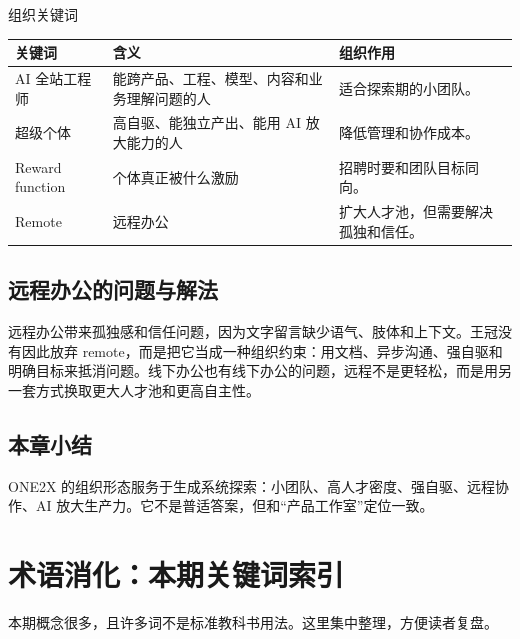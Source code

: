 \documentclass[a4paper]{article}
\begin{document}
\begin{knowledgebox}{组织关键词}
\begin{tabularx}{\textwidth}{p{}p{}X}
\toprule
关键词 & 含义 & 组织作用 \\
\midrule
AI 全站工程师 & 能跨产品、工程、模型、内容和业务理解问题的人 & 适合探索期的小团队。 \\
超级个体 & 高自驱、能独立产出、能用 AI 放大能力的人 & 降低管理和协作成本。 \\
Reward function & 个体真正被什么激励 & 招聘时要和团队目标同向。 \\
Remote & 远程办公 & 扩大人才池，但需要解决孤独和信任。 \\
\bottomrule
\end{tabularx}
\end{knowledgebox}

\subsection{远程办公的问题与解法}

远程办公带来孤独感和信任问题，因为文字留言缺少语气、肢体和上下文。王冠没有因此放弃 remote，而是把它当成一种组织约束：用文档、异步沟通、强自驱和明确目标来抵消问题。线下办公也有线下办公的问题，远程不是更轻松，而是用另一套方式换取更大人才池和更高自主性。

\subsection{本章小结}

ONE2X 的组织形态服务于生成系统探索：小团队、高人才密度、强自驱、远程协作、AI 放大生产力。它不是普适答案，但和“产品工作室”定位一致。

\section{术语消化：本期关键词索引}

本期概念很多，且许多词不是标准教科书用法。这里集中整理，方便读者复盘。
\end{document}
